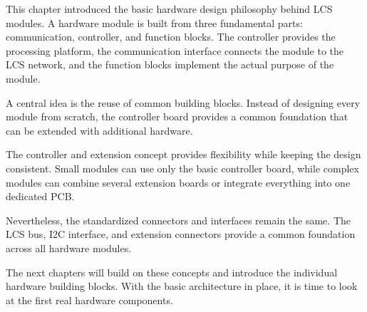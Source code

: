 
This chapter introduced the basic hardware design philosophy behind LCS modules.
A hardware module is built from three fundamental parts: communication, controller, and function 
blocks. The controller provides the processing platform, the communication interface connects the 
module to the LCS network, and the function blocks implement the actual purpose of the module.

A central idea is the reuse of common building blocks. Instead of designing every module from 
scratch, the controller board provides a common foundation that can be extended with additional 
hardware.

The controller and extension concept provides flexibility while keeping the design consistent. Small 
modules can use only the basic controller board, while complex modules can combine several extension 
boards or integrate everything into one dedicated PCB.

Nevertheless, the standardized connectors and interfaces remain the same. The LCS bus, I2C 
interface, and extension connectors provide a common foundation across all hardware modules.

The next chapters will build on these concepts and introduce the individual hardware building blocks. 
With the basic architecture in place, it is time to look at the first real hardware components.
